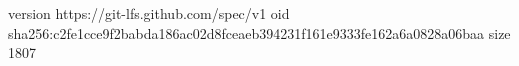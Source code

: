 version https://git-lfs.github.com/spec/v1
oid sha256:c2fe1cce9f2babda186ac02d8fceaeb394231f161e9333fe162a6a0828a06baa
size 1807
